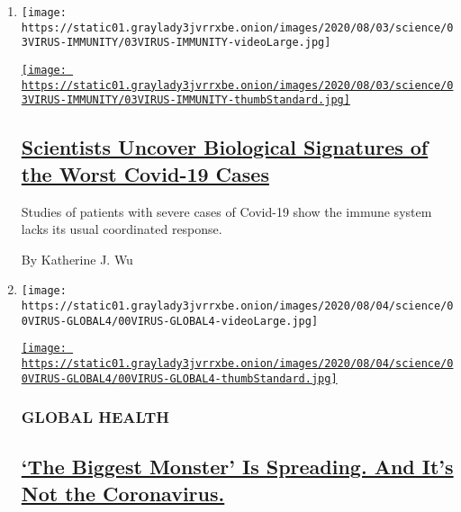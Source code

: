 \begin{enumerate}
\def\labelenumi{\arabic{enumi}.}
\item
  \texttt{[image: https://static01.graylady3jvrrxbe.onion/images/2020/08/03/science/03VIRUS-IMMUNITY/03VIRUS-IMMUNITY-videoLarge.jpg]}

  \href{/2020/08/04/health/coronavirus-immune-system.html}{\texttt{[image: https://static01.graylady3jvrrxbe.onion/images/2020/08/03/science/03VIRUS-IMMUNITY/03VIRUS-IMMUNITY-thumbStandard.jpg]}}

  \hypertarget{scientists-uncover-biological-signatures-of-the-worst-covid-19-cases}{%
  \subsection{\texorpdfstring{\href{/2020/08/04/health/coronavirus-immune-system.html}{Scientists
  Uncover Biological Signatures of the Worst Covid-19
  Cases}}{Scientists Uncover Biological Signatures of the Worst Covid-19 Cases}}\label{scientists-uncover-biological-signatures-of-the-worst-covid-19-cases}}

  Studies of patients with severe cases of Covid-19 show the immune
  system lacks its usual coordinated response.

  By Katherine J. Wu
\item
  \texttt{[image: https://static01.graylady3jvrrxbe.onion/images/2020/08/04/science/00VIRUS-GLOBAL4/00VIRUS-GLOBAL4-videoLarge.jpg]}

  \href{/2020/08/03/health/coronavirus-tuberculosis-aids-malaria.html}{\texttt{[image: https://static01.graylady3jvrrxbe.onion/images/2020/08/04/science/00VIRUS-GLOBAL4/00VIRUS-GLOBAL4-thumbStandard.jpg]}}

  \hypertarget{global-health}{%
  \subsubsection{GLOBAL HEALTH}\label{global-health}}

  \hypertarget{the-biggest-monster-is-spreading-and-its-not-the-coronavirus}{%
  \subsection{\texorpdfstring{\href{/2020/08/03/health/coronavirus-tuberculosis-aids-malaria.html}{`The
  Biggest Monster' Is Spreading. And It's Not the
  Coronavirus.}}{`The Biggest Monster' Is Spreading. And It's Not the Coronavirus.}}\label{the-biggest-monster-is-spreading-and-its-not-the-coronavirus}}


\end{enumerate}
